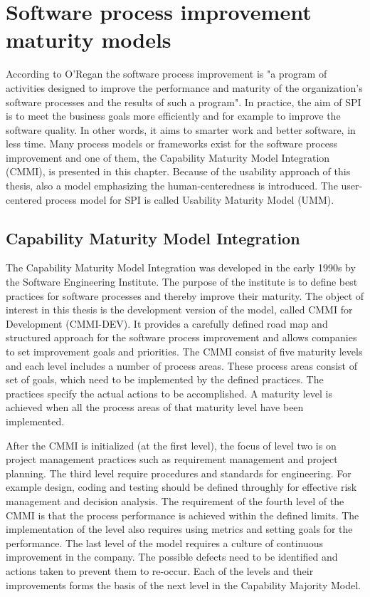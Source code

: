 \documentclass[12pt,a4paper,oneside,pdftex]{report}
\begin{document}
\chapter{Software process improvement maturity models}
\label{chapter:maturitymodels}

According to O'Regan \cite{RefWorks:29} the software process improvement is "a program of activities designed to improve the performance and maturity of the organization's software processes and the results of such a program". In practice, the aim of SPI is to meet the business goals more efficiently and for example to improve the software quality. In other words, it aims to smarter work and better software, in less time. Many process models or frameworks exist for the software process improvement and one of them, the Capability Maturity Model Integration (CMMI), is presented in this chapter. Because of the usability approach of this thesis, also a model emphasizing the human-centeredness is introduced. The user-centered process model for SPI is called Usability Maturity Model (UMM). \cite{RefWorks:29}

\section{Capability Maturity Model Integration}
The Capability Maturity Model Integration was developed in the early 1990s by the Software Engineering Institute. The purpose of the institute is to define best practices for software processes and thereby improve their maturity. The object of interest in this thesis is the development version of the model, called CMMI for Development (CMMI-DEV). It provides a carefully defined road map and  structured approach for the software process improvement and allows companies to set improvement goals and priorities. The CMMI consist of five maturity levels and each level includes a number of process areas. These process areas consist of set of goals, which need to be implemented by the defined practices. The practices specify the actual actions to be accomplished. A maturity level is achieved when all the process areas of that maturity level have been implemented. \cite{RefWorks:29}

After the CMMI is initialized (at the first level), the focus of level two is on project management practices such as requirement management and project planning. The third level require procedures and standards for engineering. For example design, coding and testing should be defined throughly for effective risk management and decision analysis. The requirement of the fourth level of the CMMI is that the process performance is achieved within the defined limits. The implementation of the level also requires using metrics and setting goals for the performance. The last level of the model requires a culture of continuous improvement in the company. The possible defects need to be identified and actions taken to prevent them to re-occur. Each of the levels and their improvements forms the basis of the next level in the Capability Majority Model. \cite{RefWorks:29}
\end{document}
